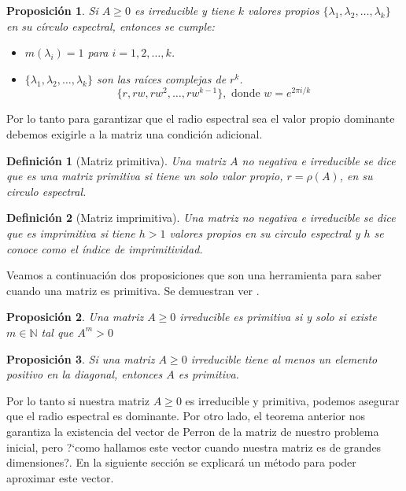 \documentclass[size=a4, parskip=half, titlepage=false, toc=flat, toc=bib, 12pt]{scrartcl}
\theoremstyle{theorem-style}
\newtheorem{nprop}{Proposición}[section]
\theoremstyle{definition-style}
\newtheorem{ndef}{Definición}[section]
\theoremstyle{remark-style}
\theoremstyle{example-style}
\theoremstyle{definition-style}
\theoremstyle{remark-style}
\begin{document}
\begin{nprop}
Si $A \geq 0$ es irreducible y tiene $k$ valores propios $\{ \lambda_1, \lambda_2, \dots, \lambda_k \}$ en su círculo espectral, entonces se cumple:
\begin{itemize}
\item $m(\lambda_i)=1$ para $i = 1,2, \dots , k$.
\item $\{ \lambda_1, \lambda_2, \dots, \lambda_k \}$ son las raíces complejas de $r^k$.
$$\{r , rw, rw^2, \dots, r w^{k-1} \}, \textrm{ donde } w = e^{2 \pi i /k} $$
\end{itemize}
\end{nprop}


Por lo tanto para garantizar que el radio espectral sea el valor propio dominante debemos exigirle a la matriz una condición adicional.

\begin{ndef}[Matriz primitiva]
Una matriz $A$ no negativa e irreducible se dice que es una matriz primitiva si tiene un solo valor propio, $r = \rho(A)$, en su circulo espectral.
\end{ndef}

\begin{ndef}[Matriz imprimitiva]
Una matriz no negativa e irreducible se dice que es imprimitiva si tiene $h > 1$ valores propios en su circulo espectral y $h$ se conoce como el índice de imprimitividad.
\end{ndef}

Veamos a continuación dos proposiciones que son una herramienta para saber cuando una matriz es primitiva. Se demuestran ver \cite{algebralineal}.

\begin{nprop}
Una matriz $A \geq  0$ irreducible es primitiva si y solo si existe $m \in \mathbb{N}$ tal que $A^m >0$
\end{nprop}

\begin{nprop}
Si una matriz $A \geq 0$ irreducible tiene al menos un elemento positivo en la diagonal, entonces $A$ es primitiva.
\end{nprop}

Por lo tanto si nuestra matriz $A \geq 0$ es irreducible y primitiva, podemos asegurar que el radio espectral es dominante. Por otro lado, el teorema anterior nos garantiza la existencia del vector de Perron de la matriz de nuestro problema inicial, pero ?`como hallamos este vector cuando nuestra matriz es de grandes dimensiones?. En la siguiente sección se explicará un método para poder aproximar este vector.
\end{document}
